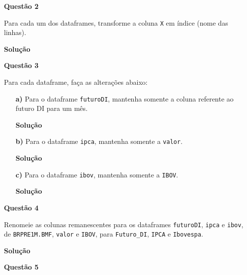\documentclass[12pt, a4paper]{article}
\begin{document}
\textbf{Questão 2}

Para cada um dos dataframes, transforme a coluna \texttt{X} em índice (nome das linhas).



\textbf{Solução}





\textbf{Questão 3}

Para cada dataframe, faça as alterações abaixo:

\begin{itemize}
	\item[\textbf{a)}] Para o dataframe \texttt{futuroDI}, mantenha somente a coluna referente ao futuro DI para um mês.
	
	
	
	\textbf{Solução}
	
	
	
	
	
	\item[\textbf{b)}] Para o dataframe \texttt{ipca}, mantenha somente a \texttt{valor}.
	
	
	
	\textbf{Solução}
	
	
	
	
	
	\item[\textbf{c)}] Para o dataframe \texttt{ibov}, mantenha somente a \texttt{IBOV}.
	
	
	
	\textbf{Solução}
	
	
	
	
	
\end{itemize}



\textbf{Questão 4}

Renomeie as colunas remanescentes para os dataframes \texttt{futuroDI}, \texttt{ipca} e \texttt{ibov}, de \texttt{BRPRE1M.BMF}, \texttt{valor} e \texttt{IBOV}, para \texttt{Futuro\_DI}, \texttt{IPCA} e \texttt{Ibovespa}.



\textbf{Solução}





\textbf{Questão 5}
\end{document}
